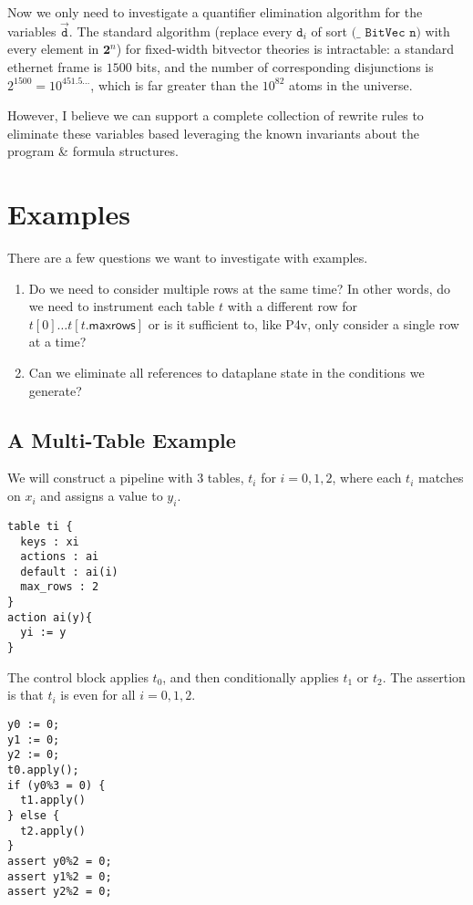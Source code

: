 \documentclass{article}
\begin{document}
Now we only need to investigate a quantifier elimination algorithm for
the variables $\vec{\texttt{d}}$. The standard algorithm (replace
every $\texttt{d}_i$ of sort $\texttt{(\_~BitVec~n)}$ with every
element in $\mathbf{2}^n$) for fixed-width bitvector theories is
intractable: a standard ethernet frame is $1500$ bits, and the number
of corresponding disjunctions is $2^{1500} = 10^{451.5\ldots}$, which
is far greater than the $10^{82}$ atoms in the universe.

However, I believe we can support a complete collection of rewrite
rules to eliminate these variables based leveraging the known
invariants about the program \& formula structures.

\section{Examples}

There are a few questions we want to investigate with examples.
\begin{enumerate}
\item \label{question:rowiter}
  Do we need to consider multiple rows at the same time? In other words, do
  we need to instrument each table $t$ with a different row for \(t[0]\ldots
  t[t.\mathsf{maxrows}]\) or is it sufficient to, like P4v, only consider a
  single row at a time?
\item \label{question:elimination}
  Can we eliminate all references to dataplane state in the conditions we
  generate?
\end{enumerate}

\subsection{A Multi-Table Example}
We will construct a pipeline with 3 tables, \(t_i\) for \(i=0,1,2\),
where each \(t_i\) matches on \(x_i\) and assigns a value to
\(y_i\).
\begin{verbatim}
table ti {
  keys : xi
  actions : ai
  default : ai(i)
  max_rows : 2
}
action ai(y){
  yi := y
}
\end{verbatim}

The control block applies \(t_0\), and then conditionally applies
\(t_1\) or \(t_2\). The assertion is that \(t_i\) is even for all \(i=0,1,2\).

\begin{verbatim}
y0 := 0;
y1 := 0;
y2 := 0;
t0.apply();
if (y0%3 = 0) {
  t1.apply()
} else {
  t2.apply()
}
assert y0%2 = 0;
assert y1%2 = 0;
assert y2%2 = 0;
\end{verbatim}
\end{document}
